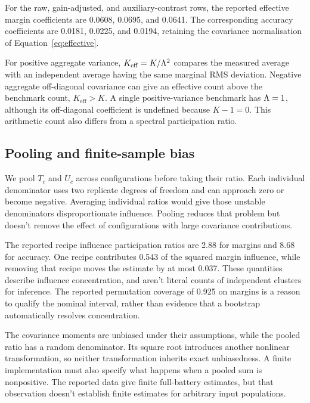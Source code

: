 For the raw, gain-adjusted, and auxiliary-contrast rows, the reported effective margin coefficients are 0.0608, 0.0695, and 0.0641. The corresponding accuracy coefficients are 0.0181, 0.0225, and 0.0194, retaining the covariance normalisation of Equation~\ref{eq:effective}.

For positive aggregate variance, $K_{\mathrm{eff}}=K/\Lambda^2$ compares the measured average with an independent average having the same marginal RMS deviation. Negative aggregate off-diagonal covariance can give an effective count above the benchmark count, $K_{\mathrm{eff}}>K$. A single positive-variance benchmark has $\Lambda=1$, although its off-diagonal coefficient is undefined because $K-1=0$. This arithmetic count also differs from a spectral participation ratio.

\subsection{Pooling and finite-sample bias}
We pool $T_c$ and $U_c$ across configurations before taking their ratio. Each individual denominator uses two replicate degrees of freedom and can approach zero or become negative. Averaging individual ratios would give those unstable denominators disproportionate influence. Pooling reduces that problem but doesn't remove the effect of configurations with large covariance contributions.

The reported recipe influence participation ratios are 2.88 for margins and 8.68 for accuracy. One recipe contributes 0.543 of the squared margin influence, while removing that recipe moves the estimate by at most 0.037. These quantities describe influence concentration, and aren't literal counts of independent clusters for inference. The reported permutation coverage of 0.925 on margins is a reason to qualify the nominal interval, rather than evidence that a bootstrap automatically resolves concentration.

The covariance moments are unbiased under their assumptions, while the pooled ratio has a random denominator. Its square root introduces another nonlinear transformation, so neither transformation inherits exact unbiasedness. A finite implementation must also specify what happens when a pooled sum is nonpositive. The reported data give finite full-battery estimates, but that observation doesn't establish finite estimates for arbitrary input populations.


